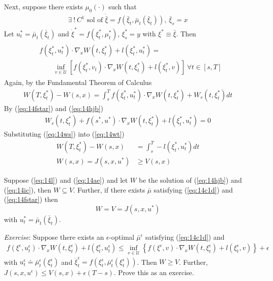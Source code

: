 Next, suppose there exists $\mu_0(\cdot)$ such that
\begin{align}
\label{eq:14c1d}
\exists~ !~ C^1 \text{ sol of } \dot{\bar{\xi}} = f(\bar{\xi}_t,\bar{\mu}_t(\bar{\xi}_t)), ~\bar{\xi}_s=x
\end{align}
Let $u_t^\ast=\bar{\mu}_t(\bar{\xi}_t)$ and $\dot{\xi}^\ast = f(\xi_t^\ast,\mu_t^\ast)$, $\xi_s^\ast=y$ with $\xi^\ast\equiv\bar{\xi}$. Then
\begin{align}
\label{eq:14fstar}
\begin{split}
&f(\xi_t^\ast,u_t^\ast)\cdot\nabla_xW(t,\xi_t^\ast) + l(\xi_t^\ast,u_t^\ast) = \\
&\qquad \inf_{v\in\mathcal{U}}\left[ f(\xi_t^\ast,v_t)\cdot\nabla_xW(t,\xi_t^\ast) + l(\xi_t^\ast,v) \right] ~\forall t\in[s,T]
\end{split}
\end{align}
Again, by the Fundamental Theorem of Calculus
\begin{align}
\label{eq:14wt}
W(T,\xi_t^\ast)-W(s,x) = \int_s^T f(\xi_t^\ast,u_t^\ast)\cdot\nabla_xW(t,\xi_t^\ast)+W_s(t,\xi_t^\ast)dt
\end{align}
By (\ref{eq:14fstar}) and (\ref{eq:14hjb})
\begin{align}
\label{eq:14ws}
W_s(t,\xi_t^\ast) + f(s^\ast,u^\ast)\cdot\nabla_xW(t,\xi_t^\ast) + l(\xi_t^\ast,u_t^\ast) = 0
\end{align}
Substituting (\ref{eq:14ws}) into (\ref{eq:14wt})
\begin{align}
\label{eq:14wsx}
W(T,\xi_t^\ast) - W(s,x) &= \int_s^T -l(\xi_t^\ast,u_t^\ast)dt \nonumber \\
W(s,x) = J(s,x,u^\ast) &\geq V(s,x)
\end{align}

\begin{theorem}
Suppose (\ref{eq:14l}) and (\ref{eq:14ae}) and let $W$ be the solution of (\ref{eq:14hjb}) and (\ref{eq:14ic}), then $W\subseteq V$. Further, if there exists $\bar{\mu}$ satisfying (\ref{eq:14c1d}) and (\ref{eq:14fstar}) then
$$W=V=J(s,x,u^\ast)$$
with $u_t^\ast = \bar{\mu}_t(\bar{\xi}_t)$.
\end{theorem}

\textit{Exercise}: Suppose there exists an $\epsilon$-optimal $\bar{\mu}^\epsilon$ satisfying (\ref{eq:14c1d}) and
\begin{align}
\label{eq:14feps}
f(\xi^\epsilon,u_t^\epsilon)\cdot\nabla_xW(t,\xi_t^\epsilon) + l(\xi_t^\epsilon,u_t^\epsilon) \leq \inf_{v\in\mathcal{U}} \left\lbrace f(\xi^\epsilon,v)\cdot\nabla_x W(t,\xi_t^\epsilon) + l(\xi_t^\epsilon,v) \right\rbrace + \epsilon
\end{align}
with $u_t^\epsilon\doteq \bar{\mu}_t^\epsilon(\xi_t^\epsilon)$ and $\dot{\xi}_t^\epsilon = f(\xi_t^\epsilon, \bar{\mu}_t^\epsilon(\xi_t^\epsilon))$. Then $W\geq V$. Further, $J(s,x,u^\epsilon) \leq V(s,x) + \epsilon(T-s)$. Prove this as an exercise.


